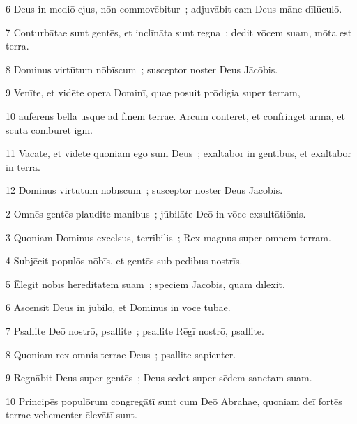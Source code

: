 \psalmVerse
  {\phantom{00}6}
  {Deus in mediō ejus, nōn commovēbitur~; adjuvābit eam Deus māne dīlūculō.}


\psalmVerse
  {\phantom{00}7}
  {Conturbātae sunt gentēs, et inclīnāta sunt regna~; dedit vōcem suam, mōta est terra.}


\psalmVerse
  {\phantom{00}8}
  {Dominus virtūtum nōbīscum~; susceptor noster Deus Jācōbis.}


\psalmVerse
  {\phantom{00}9}
  {Venīte, et vidēte opera Dominī, quae posuit prōdigia super terram,}


\psalmVerse
  {\phantom{0}10}
  {auferens bella usque ad fīnem terrae. Arcum conteret, et confringet arma, et scūta combūret ignī.}


\psalmVerse
  {\phantom{0}11}
  {Vacāte, et vidēte quoniam egō sum Deus~; exaltābor in gentibus, et exaltābor in terrā.}


\psalmVerse
  {\phantom{0}12}
  {Dominus virtūtum nōbīscum~; susceptor noster Deus Jācōbis.}




\psalmVerse
  {\phantom{00}2}
  {Omnēs gentēs plaudite manibus~; jūbilāte Deō in vōce exsultātiōnis.}


\psalmVerse
  {\phantom{00}3}
  {Quoniam Dominus excelsus, terribilis~; Rex magnus super omnem terram.}


\psalmVerse
  {\phantom{00}4}
  {Subjēcit populōs nōbīs, et gentēs sub pedibus nostrīs.}


\psalmVerse
  {\phantom{00}5}
  {Ēlēgit nōbīs hērēditātem suam~; speciem Jācōbis, quam dīlexit.}


\psalmVerse
  {\phantom{00}6}
  {Ascensit Deus in jūbilō, et Dominus in vōce tubae.}


\psalmVerse
  {\phantom{00}7}
  {Psallite Deō nostrō, psallite~; psallite Rēgī nostrō, psallite.}


\psalmVerse
  {\phantom{00}8}
  {Quoniam rex omnis terrae Deus~; psallite sapienter.}


\psalmVerse
  {\phantom{00}9}
  {Regnābit Deus super gentēs~; Deus sedet super sēdem sanctam suam.}


\psalmVerse
  {\phantom{0}10}
  {Principēs populōrum congregātī sunt cum Deō Ābrahae, quoniam deī fortēs terrae vehementer ēlevātī sunt.}



